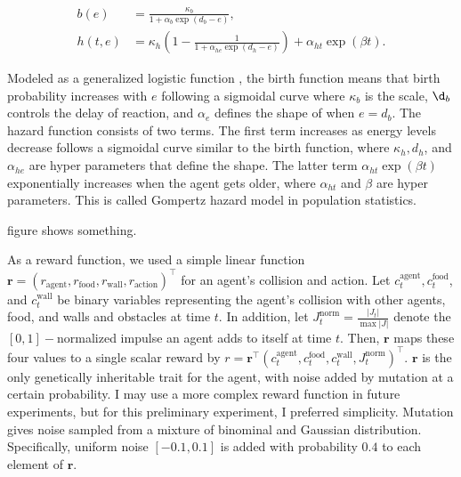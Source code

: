 \begin{align}
  b(e) &=  \frac{\kappa_{b}}{1 + \alpha_{b}\exp(d_{b} - e)}, \label{eq:b} \\
  h(t, e) &= \kappa_{h} \left(1 - \frac{1}{1 + \alpha_{he} \exp(d_{h} - e)} \right) + \alpha_{ht} \exp(\beta t). \label{eq:h}
\end{align}

Modeled as a generalized logistic function \citep{richardsFlexibleGrowthFunction1959}, the birth function\label{eq:b} means that birth probability increases with $e$ following a sigmoidal curve where $\kappa_{b}$ is the scale, $\d_{b}$ controls the delay of reaction, and $\alpha_{e}$ defines the shape of when $e=d_{b}$. The hazard function\label{eq:h} consists of two terms. The first term increases as energy levels decrease follows a sigmoidal curve similar to the birth function, where $\kappa_{h}, d_{h}$, and $\alpha_{he}$ are hyper parameters that define the shape. The latter term $\alpha_{ht} \exp(\beta t)$ exponentially increases when the agent gets older, where $\alpha_{ht}$ and $\beta$ are hyper parameters. This is called Gompertz hazard model\citep{gompertzXXIVNatureFunction1825,kirkwoodDecipheringDeathCommentary2015} in population statistics.

figure shows something.


As a reward function, we used a simple linear function $\mathbf{r} = \left(r_{\textrm{agent}}, r_{\textrm{food}}, r_{\textrm{wall}}, r_{\textrm{action}} \right)^{\intercal} $ for an agent's collision and action. Let $c_{t}^{\textrm{agent}}, c_{t}^{\textrm{food}}$, and $c_{t}^{\textrm{wall}}$ be binary variables representing the agent's collision with other agents, food, and walls and obstacles at time $t$. In addition, let $J_{t}^{\textrm{norm}} = \frac{|J_{t}|}{\max{|J|}}$ denote the $[0, 1]-$normalized impulse an agent adds to itself at time $t$. Then, $\mathbf{r}$ maps these four values to a single scalar reward by $r = \mathbf{r}^{\intercal} (c_{t}^{\textrm{agent}}, c_{t}^{\textrm{food}}, c_{t}^{\textrm{wall}}, J_{t}^{\textrm{norm}})^{\intercal}$. $\mathbf{r}$ is the only genetically inheritable trait for the agent, with noise added by mutation at a certain probability. I may use a more complex reward function in future experiments, but for this preliminary experiment, I preferred simplicity. Mutation gives noise sampled from a mixture of binominal and Gaussian distribution. Specifically, uniform noise $[-0.1, 0.1]$ is added with probability $0.4$ to each element of $\mathbf{r}$.

